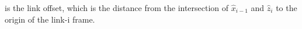 \documentclass[preview]{standalone}
\begin{document}
\begin{center}
is the link offset, which is the distance from the intersection of $\hat{x}_{i-1}$ and $\hat{z}_{i}$ to the origin of the link-i frame.
\end{center}
\end{document}
